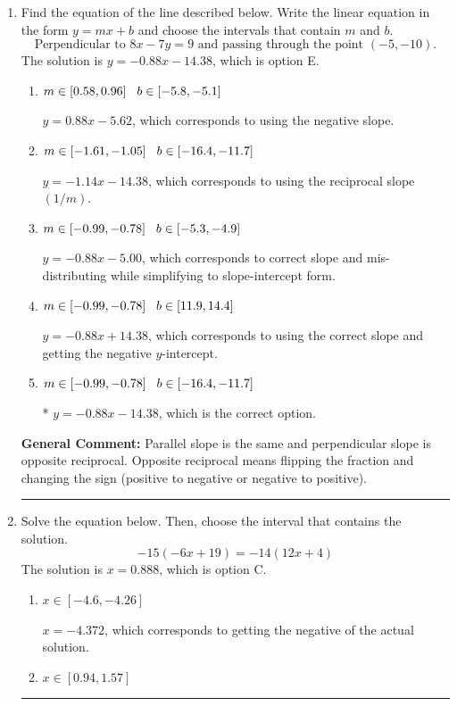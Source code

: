 \documentclass{extbook}[14pt]
\newcommand{\litem}[1]{\item #1

\rule{\textwidth}{0.4pt}}
\begin{document}
\begin{enumerate}\litem{
Find the equation of the line described below. Write the linear equation in the form $ y=mx+b $ and choose the intervals that contain $m$ and $b$.
\[ \text{Perpendicular to } 8 x - 7 y = 9 \text{ and passing through the point } (-5, -10). \]The solution is \( y = -0.88x - 14.38 \), which is option E.\begin{enumerate}[label=\Alph*.]
\item \( m \in [0.58, 0.96] \hspace*{3mm} b \in [-5.8, -5.1] \)

 $y = 0.88x - 5.62$, which corresponds to using the negative slope.
\item \( m \in [-1.61, -1.05] \hspace*{3mm} b \in [-16.4, -11.7] \)

 $y = -1.14x - 14.38$, which corresponds to using the reciprocal slope $(1/m)$.
\item \( m \in [-0.99, -0.78] \hspace*{3mm} b \in [-5.3, -4.9] \)

 $y = -0.88x - 5.00$, which corresponds to correct slope and mis-distributing while simplifying to slope-intercept form.
\item \( m \in [-0.99, -0.78] \hspace*{3mm} b \in [11.9, 14.4] \)

 $y = -0.88x + 14.38$, which corresponds to using the correct slope and getting the negative $y$-intercept.
\item \( m \in [-0.99, -0.78] \hspace*{3mm} b \in [-16.4, -11.7] \)

* $y = -0.88x - 14.38$, which is the correct option.
\end{enumerate}

\textbf{General Comment:} Parallel slope is the same and perpendicular slope is opposite reciprocal. Opposite reciprocal means flipping the fraction and changing the sign (positive to negative or negative to positive).
}
\litem{
Solve the equation below. Then, choose the interval that contains the solution.
\[ -15(-6x + 19) = -14(12x + 4) \]The solution is \( x = 0.888 \), which is option C.\begin{enumerate}[label=\Alph*.]
\item \( x \in [-4.6, -4.26] \)

$x = -4.372$, which corresponds to getting the negative of the actual solution.
\item \( x \in [0.94, 1.57] \)


\end{enumerate}}
\end{enumerate}
\end{document}
